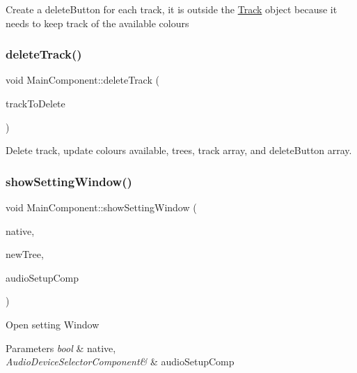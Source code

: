 Create a delete\+Button for each track, it is outside the \mbox{\hyperlink{class_track}{Track}} object because it needs to keep track of the available colours \mbox{\label{class_main_component_a6e63d5b027c5b9b9bdd81378e0d9c55e}} 
\subsubsection{\texorpdfstring{deleteTrack()}{deleteTrack()}}
{\footnotesize\ttfamily void Main\+Component\+::delete\+Track (\begin{DoxyParamCaption}\item[{String}]{track\+To\+Delete }\end{DoxyParamCaption})}

Delete track, update colours available, trees, track array, and delete\+Button array. \mbox{\label{class_main_component_a8b2111fded9a8ff483c53c86c1827785}} 
\subsubsection{\texorpdfstring{showSettingWindow()}{showSettingWindow()}}
{\footnotesize\ttfamily void Main\+Component\+::show\+Setting\+Window (\begin{DoxyParamCaption}\item[{bool}]{native,  }\item[{const Value\+Tree \&}]{new\+Tree,  }\item[{Audio\+Device\+Selector\+Component \&}]{audio\+Setup\+Comp }\end{DoxyParamCaption})}

Open setting Window 
\begin{DoxyParams}{Parameters}
{\em bool} & native, \\
\hline
{\em Audio\+Device\+Selector\+Component\&} & audio\+Setup\+Comp \\
\hline
\end{DoxyParams}
\mbox{\label{class_main_component_a4e6cc68f274c8f0aef85e089af9ccc8f}} 
